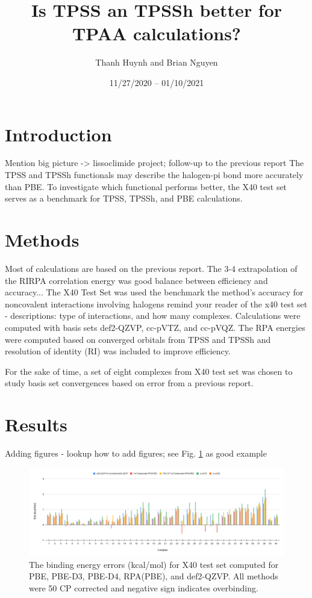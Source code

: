 \documentclass[11pt]{article}
\title{\textbf{Is TPSS an TPSSh better for TPAA calculations?}}
\author{Thanh Huynh and Brian Nguyen}
\date{11/27/2020 -- 01/10/2021 }
\newcommand{\brian}[1]{{\color{orange} #1}}
\begin{document}
\maketitle

\section{Introduction}

\brian{Mention big picture -> lissoclimide project; follow-up to the
  previous report}
The TPSS and TPSSh functionals may describe the halogen-pi bond more
accurately than PBE. To investigate which functional performs better,
the X40 test set serves as a benchmark for TPSS, TPSSh, and PBE 
calculations.  


\section{Methods}

\brian{Most of calculations are based on the previous report. The 3-4
  extrapolation of the RIRPA correlation energy was good balance between
  efficiency and accuracy...}
The X40 Test Set was used the benchmark the method's accuracy for 
noncovalent interactions involving halogens \brian{remind your reader
  of the x40 test set - descriptions: type of interactions, and how
  many complexes}. Calculations were computed
with basis sets def2-QZVP, cc-pVTZ, and cc-pVQZ. The RPA energies were
computed based on converged orbitals from TPSS and TPSSh and resolution
of identity (RI) was included to improve efficiency. 

\brian{For the sake of time,} a set of eight complexes from X40 test set
was chosen to study basis set convergences based on error from a previous
report. 

\section{Results}

\brian{Adding figures - lookup how to add figures; see Fig. \ref{fig:rpa_basis}
  as good example}

\begin{figure}[hbpt]
  \centering
  \includegraphics[scale=0.25]{def2-QZVP_error.png}
  \caption{The binding energy errors (kcal/mol) for X40 test set computed
    for PBE, PBE-D3, PBE-D4, RPA(PBE), and def2-QZVP. All methods were 50
    CP corrected and negative sign indicates overbinding.}
  \label{fig:rpa_basis}
\end{figure}
\end{document}
